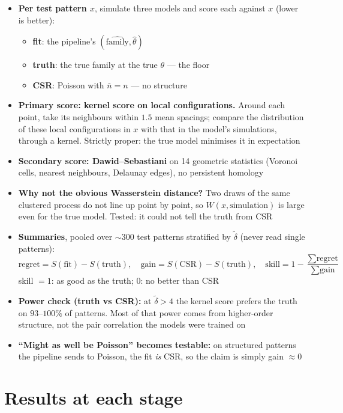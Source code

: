 \documentclass[11pt]{article}
\newcommand{\dt}{\tilde\delta}
\newcommand{\nb}{\bar n}
\begin{document}
\begin{itemize}
  \item \textbf{Per test pattern $x$}, simulate three models and score each against $x$ (lower is better):
  \begin{itemize}
    \item \textbf{fit}: the pipeline's $(\widehat{\text{family}}, \hat\theta)$
    \item \textbf{truth}: the true family at the true $\theta$ --- the floor
    \item \textbf{CSR}: Poisson with $\nb=n$ --- no structure
  \end{itemize}
  \item \textbf{Primary score: kernel score on local configurations.} Around each point, take its neighbours within $1.5$ mean spacings; compare the distribution of these local configurations in $x$ with that in the model's simulations, through a kernel. Strictly proper: the true model minimises it in expectation
  \item \textbf{Secondary score: Dawid--Sebastiani} on 14 geometric statistics (Voronoi cells, nearest neighbours, Delaunay edges), no persistent homology
  \item \textbf{Why not the obvious Wasserstein distance?} Two draws of the same clustered process do not line up point by point, so $W(x,\text{simulation})$ is large even for the true model. Tested: it could not tell the truth from CSR
  \item \textbf{Summaries}, pooled over $\sim$300 test patterns stratified by $\dt$ (never read single patterns):
  \[
    \text{regret} = S(\text{fit}) - S(\text{truth}), \quad
    \text{gain} = S(\text{CSR}) - S(\text{truth}), \quad
    \text{skill} = 1 - \frac{\sum \text{regret}}{\sum \text{gain}}
  \]
  skill $=1$: as good as the truth; $0$: no better than CSR
  \item \textbf{Power check (truth vs CSR):} at $\dt>4$ the kernel score prefers the truth on $93$--$100\%$ of patterns. Most of that power comes from higher-order structure, not the pair correlation the models were trained on
  \item \textbf{``Might as well be Poisson'' becomes testable:} on structured patterns the pipeline sends to Poisson, the fit \emph{is} CSR, so the claim is simply gain $\approx0$
\end{itemize}

\section{Results at each stage}
\end{document}
